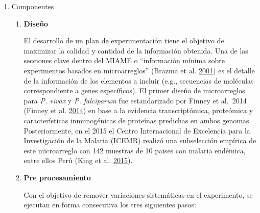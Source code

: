 \documentclass[
  a4paper]{article}
\begin{document}
\begin{enumerate}
\def\labelenumi{\alph{enumi}.}
\item
  Componentes

  \begin{enumerate}
  \def\labelenumii{\roman{enumii}.}
  \item
    \textbf{Diseño}

    El desarrollo de un plan de experimentación tiene el objetivo de
    maximizar la calidad y cantidad de la información obtenida. Una de
    las secciones clave dentro del MIAME o ``información mínima sobre
    experimentos basados en microarreglos'' (Brazma et al.
    \protect\hyperlink{ref-brazma2001}{2001}) es el detalle de la
    información de los elementos a incluir (e.g., secuencias de
    moléculas correspondiente a genes específicos). El primer diseño de
    microarreglos para \emph{P. vivax} y \emph{P. falciparum} fue
    estandarizado por Finney et al.~2014 (Finney et al.
    \protect\hyperlink{ref-Finney2014}{2014}) en base a la evidencia
    transcriptómica, proteómica y características inmunogénicas de
    proteínas predichas en ambos genomas. Posteriormente, en el 2015 el
    Centro Internacional de Excelencia para la Investigación de la
    Malaria (ICEMR) realizó una subselección empírica de este
    microarreglo con 142 muestras de 10 paises con malaria endémica,
    entre ellos Perú (King et al.
    \protect\hyperlink{ref-King2015FOC}{2015}).
  \item
    \textbf{Pre procesamiento}

    Con el objetivo de remover variaciones sistemáticas en el
    experimento, se ejecutan en forma consecutiva los tres siguientes
    pasos:


\end{enumerate}
\end{enumerate}
\end{document}
